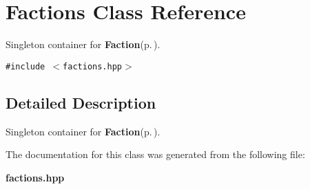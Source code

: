 \section{Factions Class Reference}
\label{classFactions}
Singleton container for {\bf Faction}{\rm (p.\,\pageref{classFaction})}.  


{\tt \#include $<$factions.hpp$>$}



\subsection{Detailed Description}
Singleton container for {\bf Faction}{\rm (p.\,\pageref{classFaction})}. 



The documentation for this class was generated from the following file:\begin{CompactItemize}
\item 
{\bf factions.hpp}\end{CompactItemize}
